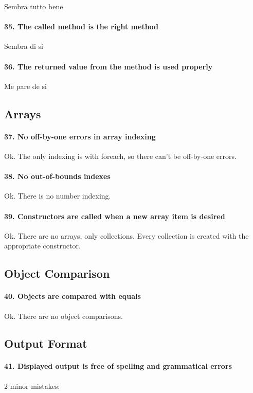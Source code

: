 \documentclass[english]{article}
\begin{document}
Sembra tutto bene

\paragraph{35. The called method is the right method}

Sembra di si

\paragraph{36. The returned value from the method is used properly}

Me pare de si


\subsection{Arrays}
\paragraph{37. No off-by-one errors in array indexing}
Ok.
The only indexing is with foreach, so there can't be off-by-one errors.

\paragraph{38. No out-of-bounds indexes}
Ok.
There is no number indexing.

\paragraph{39. Constructors are called when a new array item is desired}
Ok.
There are no arrays, only collections. Every collection is created with the appropriate constructor.

\subsection{Object Comparison}
\paragraph{40. Objects are compared with equals}
Ok.
There are no object comparisons.

\subsection{Output Format}
\paragraph{41. Displayed output is free of spelling and grammatical errors}
2 minor mistakes:
\end{document}
